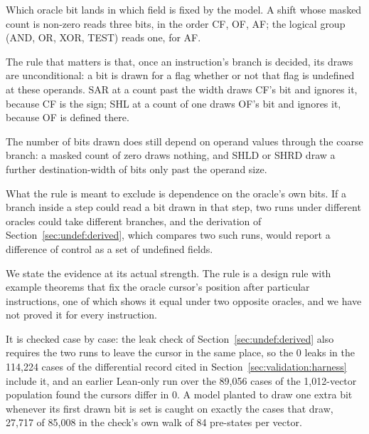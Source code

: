 \documentclass[runningheads]{llncs}
\newcommand{\src}[1]{}  %
\begin{document}
Which oracle bit lands in which field is fixed by the model. A shift whose masked count is non-zero
reads three bits, in the order CF, OF, AF; the logical group (AND, OR, XOR, TEST) reads one, for AF.
\src{X86/Semantics.lean, the .shift case; docs/DECISIONS.md D5; Tests/Nonvacuity.lean 3}
The rule that matters is that, once an instruction's branch is decided, its draws are unconditional: a
bit is drawn for a flag whether or not that flag is undefined at these operands. SAR at a count past the
width draws CF's bit and ignores it, because CF is the sign; SHL at a count of one draws OF's bit and
ignores it, because OF is defined there.
\src{X86/Flags.lean shiftFlags}
The number of bits drawn does still depend on operand values through the coarse branch: a masked count
of zero draws nothing, and SHLD or SHRD draw a further destination-width of bits only past the
operand size.
\src{Tests/Nonvacuity.lean cursor\_shift\_zero\_spends\_nothing; X86/Semantics.lean step, the .dshift arm (``SEVEN draws'');
docs/DECISIONS.md D213; BSF and BSR draw five at every source since D346}
What the rule is meant to exclude is dependence on the oracle's own bits. If a branch inside a step
could read a bit drawn in that step, two runs under different oracles could take different branches,
and the derivation of Section~\ref{sec:undef:derived}, which compares two such runs, would report a
difference of control as a set of undefined fields.
\src{X86/Semantics.lean, the bsf/bsr and division comments}
We state the evidence at its actual strength. The rule is a design rule with example theorems that fix
the oracle cursor's position after particular instructions, one of which shows it equal under two
opposite oracles, and we have not proved it for every instruction.
\src{Tests/Nonvacuity.lean cursor\_add\_spends\_nothing, cursor\_and\_spends\_one, cursor\_shift\_nonzero\_spends\_three,
cursor\_shift\_zero\_spends\_nothing, cursor\_independent\_of\_bits (the one over two oracles, one SHL at one state); docs/DECISIONS.md D213, D250}
It is checked case by case: the leak check of Section~\ref{sec:undef:derived} also requires the two runs
to leave the cursor in the same place, so the 0 leaks in the 114{,}224 cases of the differential record cited in Section~\ref{sec:validation:harness} include it, and an earlier Lean-only run over the 89{,}056 cases of the 1{,}012-vector population found the cursors differ in 0. A model planted to draw one extra bit whenever its first drawn bit is set is caught on exactly
the cases that draw, 27{,}717 of 85{,}008 in the check's own walk of 84 pre-states per vector.
\end{document}
